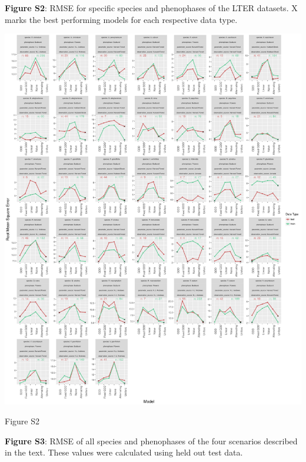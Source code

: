 \documentclass[a4paper,12pt]{article}
\begin{document}
\newpage
\textbf{Figure S2}: RMSE for specific species and phenophases of the LTER datasets. X marks the best performing models for each respective data type.

\newpage

\begin{center}
	\centering
		\includegraphics[width=1\textwidth]{supplement_best_lter_models.png}
	\caption{Figure S2}
\end{center}


\newpage

\textbf{Figure S3}: RMSE of all species and phenophases of the four scenarios described in the text. These values were calculated using held out test data.

\newpage
\end{document}
